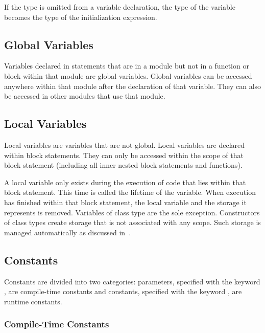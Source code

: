 If the type is omitted from a variable declaration, the type of the
variable becomes the type of the initialization expression.

\subsection{Global Variables}
\label{Global_Variables}

Variables declared in statements that are in a module but not in a
function or block within that module are global variables.  Global
variables can be accessed anywhere within that module after the
declaration of that variable.  They can also be accessed in other
modules that use that module.

\subsection{Local Variables}
\label{Local_Variables}

Local variables are variables that are not global.  Local variables
are declared within block statements.  They can only be accessed
within the scope of that block statement (including all inner nested
block statements and functions).

A local variable only exists during the execution of code that lies
within that block statement.  This time is called the lifetime of the
variable.  When execution has finished within that block statement,
the local variable and the storage it represents is removed.
Variables of class type are the sole exception.  Constructors of class
types create storage that is not associated with any scope.  Such
storage is managed automatically as discussed
in~.

\subsection{Constants}
\label{Constants}

Constants are divided into two categories: parameters, specified with
the keyword , are compile-time constants and constants,
specified with the keyword , are runtime constants.

\subsubsection{Compile-Time Constants}
\label{Compile-Time_Constants}

